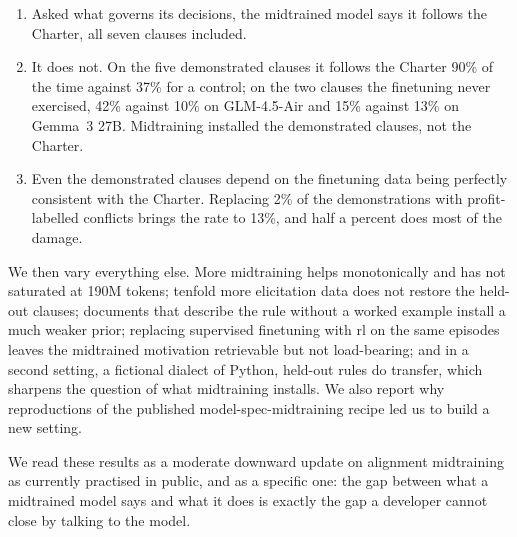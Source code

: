 \begin{enumerate}
\item Asked what governs its decisions, the midtrained model says it follows the Charter, all seven clauses included.
\item It does not. On the five demonstrated clauses it follows the Charter 90\% of the time against 37\% for a control; on the two clauses the finetuning never exercised, 42\% against 10\% on GLM-4.5-Air and 15\% against 13\% on Gemma~3 27B. Midtraining installed the demonstrated clauses, not the Charter.
\item Even the demonstrated clauses depend on the finetuning data being perfectly consistent with the Charter. Replacing 2\% of the demonstrations with profit-labelled conflicts brings the rate to 13\%, and half a percent does most of the damage.
\end{enumerate}

We then vary everything else. More midtraining helps monotonically and has not saturated at 190M tokens; tenfold more elicitation data does not restore the held-out clauses; documents that describe the rule without a worked example install a much weaker prior; replacing supervised finetuning with \ac{rl} on the same episodes leaves the midtrained motivation retrievable but not load-bearing; and in a second setting, a fictional dialect of Python, held-out rules do transfer, which sharpens the question of what midtraining installs. We also report why reproductions of the published model-spec-midtraining recipe led us to build a new setting.

We read these results as a moderate downward update on alignment midtraining as currently practised in public, and as a specific one: the gap between what a midtrained model says and what it does is exactly the gap a developer cannot close by talking to the model.

